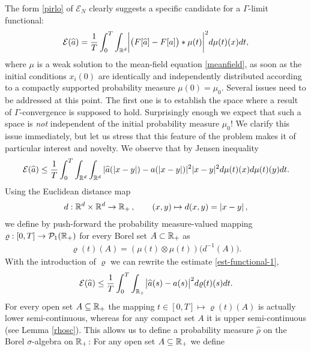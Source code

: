 The form \eqref{pirlo} of $\mathcal E_N$ clearly suggests a specific candidate for a $\Gamma$-limit functional:
\begin{align}\label{ourfunctional}
	\mathcal E(\widehat a)=\frac{1}{T}\int_0^T \int_{\mathbb{R}^d} \biggl|\bigl(F[\widehat a]-F[a]\bigr)\ast\mu(t)\biggr|^2d\mu(t)(x)dt,
\end{align}
where $\mu$ is a weak solution to the mean-field equation \eqref{meanfield}, as soon as the initial conditions $x_i(0)$ are identically and independently 
distributed according to a compactly supported probability measure $\mu(0)=\mu_0$. Several issues  need to be addressed at this point.
The first one is to establish the space where a result of $\Gamma$-convergence is supposed to hold. Surprisingly enough we expect that
such a space is {\it not} independent of the initial probability measure $\mu_0$! We clarify this issue immediately, but let us stress that this feature of the problem
makes it of particular interest and novelty. We observe that
by Jensen inequality
\begin{equation}\label{est-functional-1}
\mathcal E(\widehat a) \leq \frac{1}{T}\int_0^T  \int_{\mathbb{R}^d} \int_{\mathbb{R}^d}  | \widehat a(| x-y|) - a(| x-y|)|^2 | x-y|^2d \mu(t)(x) d \mu(t)(y) dt.
\end{equation}
Using the Euclidean distance map
\begin{align*}
	d:\mathbb{R}^d\times\mathbb{R}^d\rightarrow\mathbb{R}_+\,,\qquad (x,y)\mapsto d(x,y)=|x-y|\,,
\end{align*}
we define by push-forward the probability measure-valued mapping $\varrho:[0,T]\rightarrow \mathcal{P}_1(\mathbb{R}_+)$  for every Borel set $A\subset\mathbb{R}_+$ as
\begin{align*}
	\varrho(t)(A)=(\mu(t)\otimes\mu(t))\bigl(d^{-1}(A)\bigr).
\end{align*}
With the introduction of $\varrho$ we can rewrite the estimate \eqref{est-functional-1},
\begin{align}\label{midpoint1}
	\mathcal E(\widehat a)\leq \frac{1}{T}  \int_0^T\int_{\mathbb{R}_+}\bigl|\widehat a(s)-a(s)\bigr|^2 d\varrho(t)(s) dt.
\end{align}
For every open set $A\subseteq\mathbb{R}_+$ the mapping $t \in [0,T] \mapsto\varrho(t)(A)$ is actually lower semi-continuous, whereas for
	any compact set $A$ it is upper semi-continuous (see Lemma \ref{rhosc}).
This allows us to define a probability measure $\widehat \rho$ on the Borel $\sigma$-algebra on $\mathbb{R}_+$: For any open set $A \subseteq \mathbb{R}_+$ we define
